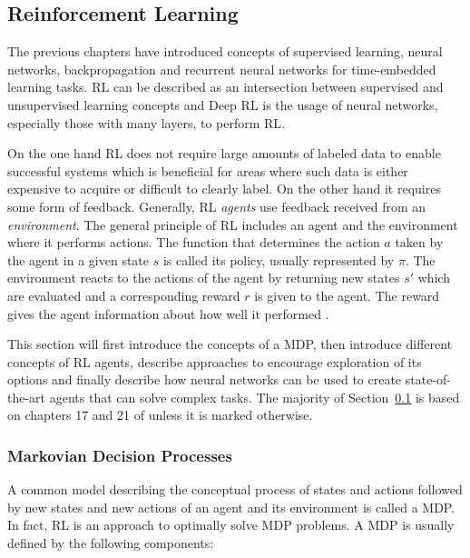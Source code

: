 \subsection{Reinforcement Learning}
\label{sub:rl}

The previous chapters have introduced concepts of supervised learning, neural networks, backpropagation and recurrent
neural networks for time-embedded
learning tasks. \ac{RL} can be described as an intersection between supervised and unsupervised learning concepts and
Deep \ac{RL} is the usage of neural networks, especially those with many layers, to perform \ac{RL}.

On the one hand \ac{RL}  does not require large amounts of labeled data to enable successful systems which is
beneficial for areas where such data is either expensive to acquire or difficult to clearly label. On the other hand it
requires some form of feedback. Generally, \ac{RL} \emph{agents} use feedback received from an \emph{environment}.  The
general principle of \ac{RL} includes an agent and the environment where it performs actions. The function
that determines the action $a$  taken by the agent in a given state $s$ is called its policy, usually represented by
$\pi$.  The environment reacts to the actions of the agent by returning new states $s'$ which are evaluated and a
corresponding reward $r$ is given to the agent. The reward gives the agent information about how well it performed
\citep[p.830f.]{russell2016artificial}.

This section will first introduce the concepts of a \ac{MDP}, then introduce different concepts of \ac{RL} agents,
describe approaches to encourage exploration of its options and finally describe how neural networks can be used to create
state-of-the-art agents that can solve complex tasks. The majority of Section~\ref{sub:rl} is based on
chapters 17 and 21 of \citet[]{russell2016artificial} unless it is marked otherwise.

\subsubsection{Markovian Decision Processes}%
\label{ssub:markovian_decision_processes}

A common model describing the conceptual process of states and actions followed by new states and new actions of an
agent and its environment is called a \acf {MDP}. In fact, \ac{RL} is an approach to optimally solve \ac{MDP} problems.
A \ac{MDP} is usually defined by the following components:

